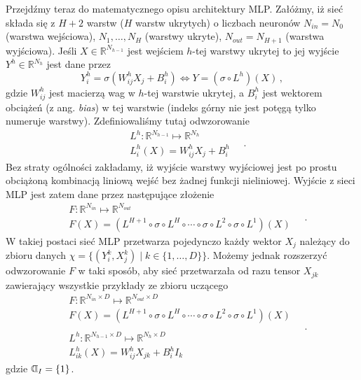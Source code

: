 \documentclass{myclass}
\begin{document}
Przejdźmy teraz do matematycznego opisu architektury MLP. Załóżmy, iż sieć składa się z \(H + 2\)
warstw (\(H\) warstw ukrytych) o liczbach neuronów \(N_{in} = N_0\) (warstwa wejściowa), \(N_1,
\ldots, N_H\) (warstwy ukryte), \(N_{out} = N_{H+1}\) (warstwa wyjściowa). Jeśli \(X \in
\mathbb{R}^{N_{h-1}}\) jest wejściem \(h\)-tej warstwy ukrytej to jej wyjście \(Y^h \in
\mathbb{R}^{N_h}\) jest dane przez
\begin{equation*}
    Y_i^h = \sigma\left(W_{ij}^hX_j + B_i^h\right) \Longleftrightarrow Y = \left(\sigma \circ L^h\right)(X)\,,
\end{equation*} 
gdzie \(W_{ij}^h\) jest macierzą wag w \(h\)-tej warstwie ukrytej, a \(B_i^h\) jest wektorem
obciążeń (z ang. \textit{bias}) w tej warstwie (indeks górny nie jest potęgą tylko numeruje
warstwy). Zdefiniowaliśmy tutaj odwzorowanie
\begin{equation*}
    \begin{split}
        &L^h : \mathbb{R}^{N_{h-1}} \mapsto \mathbb{R}^{N_{h}}\\
        &L_i^h(X) = W_{ij}^hX_j + B_i^h
    \end{split}\quad.
\end{equation*}
Bez straty ogólności zakładamy, iż wyjście warstwy wyjściowej jest po prostu obciążoną kombinacją
liniową wejść bez żadnej funkcji nieliniowej. Wyjście z sieci MLP jest zatem dane przez następujące
złożenie
\begin{equation*}
    \begin{split}
        &F: \mathbb{R}^{N_{in}} \mapsto \mathbb{R}^{N_{out}}\\
        &F(X) = \left(L^{H+1} \circ \sigma \circ L^H \circ \cdots \circ \sigma \circ L^2 \circ \sigma \circ L^1\right)(X)
    \end{split}\quad.
\end{equation*}
W takiej postaci sieć MLP przetwarza pojedynczo każdy wektor \(X_j\) należący do zbioru danych
\(\chi = \{(Y_i^k, X_j^k) \mid k \in \{1,\ldots,D\}\}\). Możemy jednak rozszerzyć odwzorowanie \(F\)
w taki sposób, aby sieć przetwarzała od razu tensor \(X_{jk}\) zawierający wszystkie przykłady ze
zbioru uczącego
\begin{equation*}
    \begin{split}
        &F: \mathbb{R}^{N_{in}\times D} \mapsto \mathbb{R}^{N_{out}\times D}\\
        &F(X) = \left(L^{H+1} \circ \sigma \circ L^H \circ \cdots \circ \sigma \circ L^2 \circ \sigma \circ L^1\right)(X)\\
        &\\
        &L^h: \mathbb{R}^{N_{h-1}\times D} \mapsto \mathbb{R}^{N_{h}\times D}\\
        &L_{ik}^h(X) = W_{ij}^h X_{jk} + B_i^h I_k
    \end{split}\quad.
\end{equation*}
gdzie \(\text{\reflectbox{$\mathbb{D}$}}_I = \{1\}\).
\end{document}

